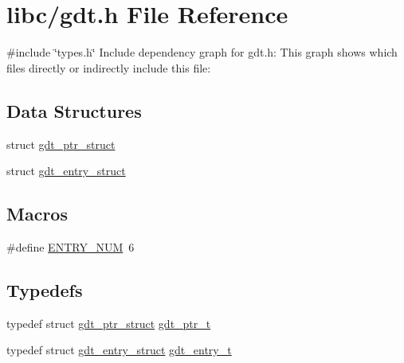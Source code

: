 \hypertarget{a00092}{}\section{libc/gdt.h File Reference}
\label{a00092}
{\ttfamily \#include \char`\"{}types.\+h\char`\"{}}\newline
Include dependency graph for gdt.\+h\+:
This graph shows which files directly or indirectly include this file\+:
\subsection*{Data Structures}
\begin{DoxyCompactItemize}
\item 
struct \hyperlink{a00202}{gdt\+\_\+ptr\+\_\+struct}
\item 
struct \hyperlink{a00206}{gdt\+\_\+entry\+\_\+struct}
\end{DoxyCompactItemize}
\subsection*{Macros}
\begin{DoxyCompactItemize}
\item 
\#define \hyperlink{a00092_abe29d44fbb5292a15af80cbb8e8a3a7d_abe29d44fbb5292a15af80cbb8e8a3a7d}{E\+N\+T\+R\+Y\+\_\+\+N\+UM}~6
\end{DoxyCompactItemize}
\subsection*{Typedefs}
\begin{DoxyCompactItemize}
\item 
typedef struct \hyperlink{a00202}{gdt\+\_\+ptr\+\_\+struct} \hyperlink{a00092_a3bf3fa6f397bda8399e1afb6283b66ca_a3bf3fa6f397bda8399e1afb6283b66ca}{gdt\+\_\+ptr\+\_\+t}
\item 
typedef struct \hyperlink{a00206}{gdt\+\_\+entry\+\_\+struct} \hyperlink{a00092_ab0b5c60e06a63669c783705278ff641e_ab0b5c60e06a63669c783705278ff641e}{gdt\+\_\+entry\+\_\+t}
\end{DoxyCompactItemize}
